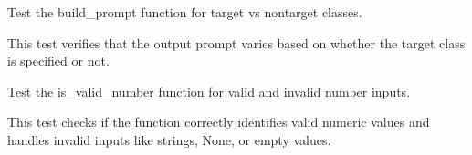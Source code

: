 \documentclass[letterpaper,10pt,english]{sphinxmanual}
\begin{document}

\begin{fulllineitems}
\label{\detokenize{test.data_storage:test.data_storage.test_llm_analyse.test_build_prompt_target_vs_non_target}}
\pysigstartsignatures
\pysiglinewithargsret
{}
{}
{}
\pysigstopsignatures
\sphinxAtStartPar
Test the build\_prompt function for target vs non\sphinxhyphen{}target classes.

\sphinxAtStartPar
This test verifies that the output prompt varies based on whether the
target class is specified or not.

\end{fulllineitems}


\begin{fulllineitems}
\label{\detokenize{test.data_storage:test.data_storage.test_llm_analyse.test_is_valid_number}}
\pysigstartsignatures
\pysiglinewithargsret
{}
{}
{}
\pysigstopsignatures
\sphinxAtStartPar
Test the is\_valid\_number function for valid and invalid number inputs.

\sphinxAtStartPar
This test checks if the function correctly identifies valid numeric values
and handles invalid inputs like strings, None, or empty values.

\end{fulllineitems}

\end{document}
